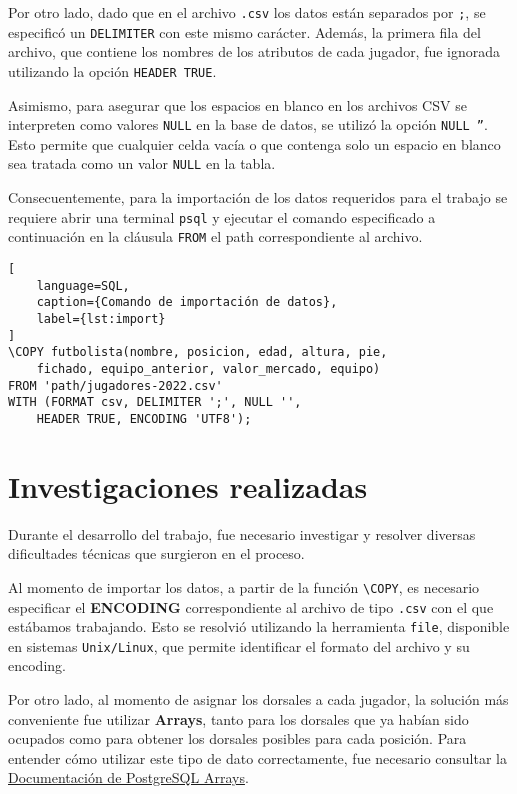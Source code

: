 \documentclass{article}
\begin{document}
Por otro lado, dado que en el archivo \texttt{.csv} los datos están separados por \texttt{;}, se especificó un \texttt{DELIMITER} con este mismo carácter. Además, la primera fila del archivo, que contiene los nombres de los atributos de cada jugador, fue ignorada utilizando la opción \texttt{HEADER TRUE}.

Asimismo, para asegurar que los espacios en blanco en los archivos CSV se interpreten como valores \texttt{NULL} en la base de datos, se utilizó la opción \texttt{NULL ''}. Esto permite que cualquier celda vacía o que contenga solo un espacio en blanco sea tratada como un valor \texttt{NULL} en la tabla.

Consecuentemente, para la importación de los datos requeridos para el trabajo se requiere abrir una terminal \texttt{psql} y ejecutar el comando especificado a continuación en la cláusula \texttt{FROM} el path correspondiente al archivo.

\begin{lstlisting}[
    language=SQL,
    caption={Comando de importación de datos},
    label={lst:import}
]
\COPY futbolista(nombre, posicion, edad, altura, pie, 
    fichado, equipo_anterior, valor_mercado, equipo) 
FROM 'path/jugadores-2022.csv' 
WITH (FORMAT csv, DELIMITER ';', NULL '', 
    HEADER TRUE, ENCODING 'UTF8');
\end{lstlisting}

\section{Investigaciones realizadas}

Durante el desarrollo del trabajo, fue necesario investigar y resolver diversas dificultades técnicas que surgieron en el proceso.

Al momento de importar los datos, a partir de la función \texttt{\textbackslash COPY}, es necesario especificar el \textbf{ENCODING} correspondiente al archivo de tipo \texttt{.csv} con el que estábamos trabajando. Esto se resolvió utilizando la herramienta \texttt{file}, disponible en sistemas \texttt{Unix/Linux}, que permite identificar el formato del archivo y su encoding.

Por otro lado, al momento de asignar los dorsales a cada jugador, la solución más conveniente fue utilizar \textbf{Arrays}, tanto para los dorsales que ya habían sido ocupados como para obtener los dorsales posibles para cada posición. Para entender cómo utilizar este tipo de dato correctamente, fue necesario consultar la \href{https://www.postgresql.org/docs/current/arrays.html}{Documentación de PostgreSQL Arrays}.
\end{document}
